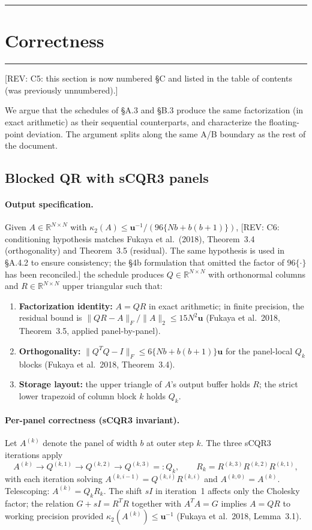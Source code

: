 \documentclass[11pt]{article}
\newcommand{\REV}[1]{\textcolor{blue!60!black}{\small\textsf{[REV: #1]}}}
\begin{document}
\bigskip\hrule
\section{Correctness}
\label{sec:C}
\hrule
\REV{C5: this section is now numbered \S C and listed in the table of
contents (was previously unnumbered).}

We argue that the schedules of \S A.3 and \S B.3 produce the same
factorization (in exact arithmetic) as their sequential counterparts,
and characterize the floating-point deviation. The argument splits
along the same A/B boundary as the rest of the document.

\subsection{Blocked QR with sCQR3 panels}
\label{sec:C1}

\paragraph{Output specification.}
Given $A \in \mathbb{R}^{N \times N}$ with
$\kappa_2(A) \le \mathbf{u}^{-1}/(96\{N b + b(b{+}1)\})$,
\REV{C6: conditioning hypothesis matches Fukaya et al.~(2018),
Theorem~3.4 (orthogonality) and Theorem~3.5 (residual). The same
hypothesis is used in \S A.4.2 to ensure consistency; the \S 4b
formulation that omitted the factor of $96\{\cdot\}$ has been
reconciled.} the schedule produces $Q \in \mathbb{R}^{N \times N}$
with orthonormal columns and $R \in \mathbb{R}^{N \times N}$ upper
triangular such that:
\begin{enumerate}[leftmargin=2em]
  \item \textbf{Factorization identity:} $A = QR$ in exact arithmetic;
    in finite precision, the residual bound is
    $\|QR - A\|_F/\|A\|_2 \le 15 N^2 \mathbf{u}$ (Fukaya et al.~2018,
    Theorem~3.5, applied panel-by-panel).
  \item \textbf{Orthogonality:} $\|Q^T Q - I\|_F \le 6\{Nb + b(b{+}1)\}\mathbf{u}$
    for the panel-local $Q_k$ blocks (Fukaya et al.~2018, Theorem~3.4).
  \item \textbf{Storage layout:} the upper triangle of $A$'s output
    buffer holds $R$; the strict lower trapezoid of column block $k$
    holds $Q_k$.
\end{enumerate}

\paragraph{Per-panel correctness (sCQR3 invariant).}
Let $A^{(k)}$ denote the panel of width $b$ at outer step $k$. The
three sCQR3 iterations apply
\[
  A^{(k)} \to Q^{(k,1)} \to Q^{(k,2)} \to Q^{(k,3)} =: Q_k,
  \qquad
  R_k = R^{(k,3)} R^{(k,2)} R^{(k,1)},
\]
with each iteration solving $A^{(k,i-1)} = Q^{(k,i)} R^{(k,i)}$ and
$A^{(k,0)} = A^{(k)}$. Telescoping: $A^{(k)} = Q_k R_k$. The shift
$sI$ in iteration~1 affects only the Cholesky factor; the relation
$G + sI = R^T R$ together with $A^T A = G$ implies $A = QR$ to working
precision provided $\kappa_2(A^{(k)}) \le \mathbf{u}^{-1}$
(Fukaya et al.~2018, Lemma~3.1).
\end{document}
